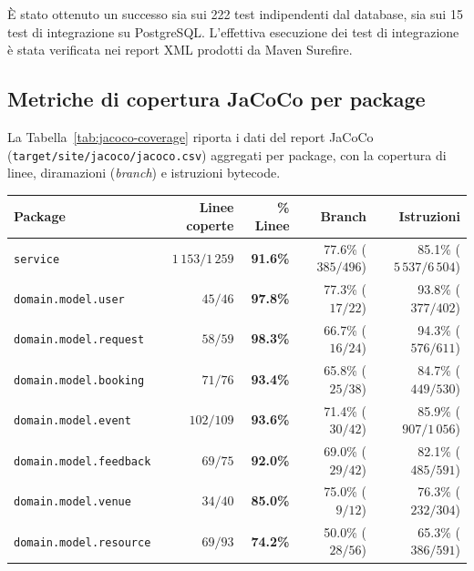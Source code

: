 È stato ottenuto un successo sia sui 222 test indipendenti dal database, sia sui 15 test di integrazione su PostgreSQL.
L'effettiva esecuzione dei test di integrazione è stata verificata nei report XML prodotti da Maven Surefire.


\subsection{Metriche di copertura JaCoCo per package}
\label{sec:metriche-jacoco}
La Tabella~\ref{tab:jacoco-coverage} riporta i dati del report JaCoCo (\texttt{target/site/\allowbreak jacoco/jacoco.csv}) aggregati per package, con la copertura di linee, diramazioni (\textit{branch}) e istruzioni bytecode.

\begin{table}[htbp]
\centering
\small
\setlength{\tabcolsep}{3pt}
\begin{tabular*}{\textwidth}{@{\extracolsep{\fill}}lrrrr@{}}
\toprule
\textbf{Package} &
\textbf{Linee coperte} &
\textbf{\% Linee} &
\textbf{Branch} &
\textbf{Istruzioni} \\
\midrule

\texttt{service}
& $1\,153 / 1\,259$
& \textbf{91.6\%}
& 77.6\% ($385 / 496$)
& 85.1\% ($5\,537 / 6\,504$) \\

\texttt{domain.model.user}
& $45 / 46$
& \textbf{97.8\%}
& 77.3\% ($17 / 22$)
& 93.8\% ($377 / 402$) \\

\texttt{domain.model.request}
& $58 / 59$
& \textbf{98.3\%}
& 66.7\% ($16 / 24$)
& 94.3\% ($576 / 611$) \\

\texttt{domain.model.booking}
& $71 / 76$
& \textbf{93.4\%}
& 65.8\% ($25 / 38$)
& 84.7\% ($449 / 530$) \\

\texttt{domain.model.event}
& $102 / 109$
& \textbf{93.6\%}
& 71.4\% ($30 / 42$)
& 85.9\% ($907 / 1\,056$) \\

\texttt{domain.model.feedback}
& $69 / 75$
& \textbf{92.0\%}
& 69.0\% ($29 / 42$)
& 82.1\% ($485 / 591$) \\

\texttt{domain.model.venue}
& $34 / 40$
& \textbf{85.0\%}
& 75.0\% ($9 / 12$)
& 76.3\% ($232 / 304$) \\

\texttt{domain.model.resource}
& $69 / 93$
& \textbf{74.2\%}
& 50.0\% ($28 / 56$)
& 65.3\% ($386 / 591$) \\


\end{tabular*}
\end{table}
